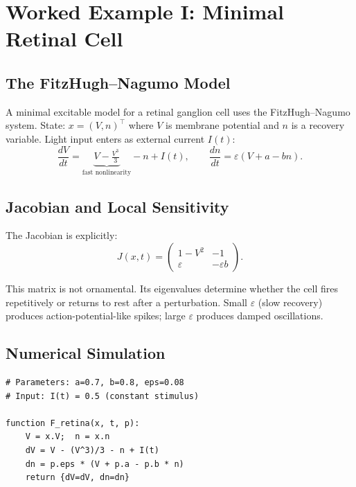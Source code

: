 \documentclass[12pt,openany]{book}
\begin{document}
\chapter{Worked Example I: Minimal Retinal Cell}
\label{ch:wk1}

\section{The FitzHugh--Nagumo Model}

A minimal excitable model for a retinal ganglion cell uses the FitzHugh--Nagumo
system. State: $x=(V,n)^\top$ where $V$ is membrane potential and $n$ is a
recovery variable. Light input enters as external current $I(t)$:
\[
  \frac{dV}{dt} = \underbrace{V - \tfrac{V^3}{3}}_{\text{fast nonlinearity}}
                 - n + I(t), \qquad
  \frac{dn}{dt} = \varepsilon(V + a - bn).
\]

\section{Jacobian and Local Sensitivity}

The Jacobian is explicitly:
\[
  J(x,t) =
  \begin{pmatrix}
    1-V^2 & -1 \\
    \varepsilon & -\varepsilon b
  \end{pmatrix}.
\]

This matrix is not ornamental. Its eigenvalues determine whether the cell fires
repetitively or returns to rest after a perturbation. Small $\varepsilon$ (slow
recovery) produces action-potential-like spikes; large $\varepsilon$ produces
damped oscillations.

\section{Numerical Simulation}

\begin{pseudocode}
\begin{lstlisting}
# Parameters: a=0.7, b=0.8, eps=0.08
# Input: I(t) = 0.5 (constant stimulus)

function F_retina(x, t, p):
    V = x.V;  n = x.n
    dV = V - (V^3)/3 - n + I(t)
    dn = p.eps * (V + p.a - p.b * n)
    return {dV=dV, dn=dn}
\end{lstlisting}
\end{pseudocode}
\end{document}
